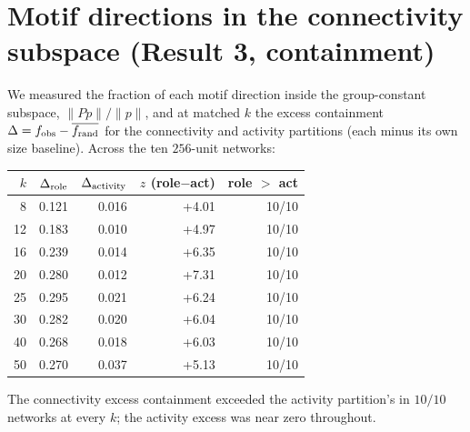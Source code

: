 \documentclass[11pt]{article}
\begin{document}
\section{Motif directions in the connectivity subspace (Result 3, containment)}
\label{sec:containment}
We measured the fraction of each motif direction inside the group-constant subspace,
$\lVert Pp\rVert/\lVert p\rVert$, and at matched $k$ the excess containment
$\Delta=f_{\rm obs}-\overline{f_{\rm rand}}$ for the connectivity and activity partitions (each
minus its own size baseline). Across the ten $256$-unit networks:
\begin{center}\small
\begin{tabular}{rrrrr}
\toprule
$k$ & $\Delta_{\rm role}$ & $\Delta_{\rm activity}$ & $z$ (role$-$act) & role $>$ act \\
\midrule
8  & 0.121 & 0.016 & +4.01 & 10/10 \\
12 & 0.183 & 0.010 & +4.97 & 10/10 \\
16 & 0.239 & 0.014 & +6.35 & 10/10 \\
20 & 0.280 & 0.012 & +7.31 & 10/10 \\
25 & 0.295 & 0.021 & +6.24 & 10/10 \\
30 & 0.282 & 0.020 & +6.04 & 10/10 \\
40 & 0.268 & 0.018 & +6.03 & 10/10 \\
50 & 0.270 & 0.037 & +5.13 & 10/10 \\
\bottomrule
\end{tabular}
\end{center}
The connectivity excess containment exceeded the activity partition's in $10/10$ networks at
every $k$; the activity excess was near zero throughout.
\end{document}
